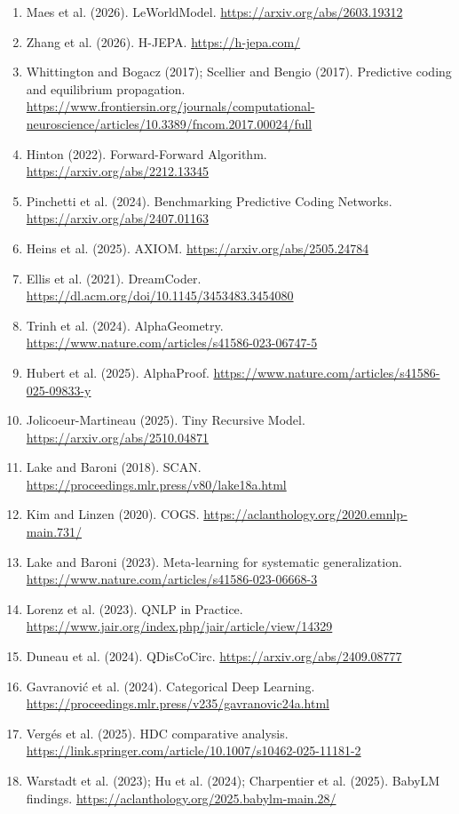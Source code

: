 \begin{enumerate}[leftmargin=*,itemsep=2pt]
\item Maes et al. (2026). LeWorldModel. \url{https://arxiv.org/abs/2603.19312}
\item Zhang et al. (2026). H-JEPA. \url{https://h-jepa.com/}
\item Whittington and Bogacz (2017); Scellier and Bengio (2017). Predictive coding and equilibrium propagation. \url{https://www.frontiersin.org/journals/computational-neuroscience/articles/10.3389/fncom.2017.00024/full}
\item Hinton (2022). Forward-Forward Algorithm. \url{https://arxiv.org/abs/2212.13345}
\item Pinchetti et al. (2024). Benchmarking Predictive Coding Networks. \url{https://arxiv.org/abs/2407.01163}
\item Heins et al. (2025). AXIOM. \url{https://arxiv.org/abs/2505.24784}
\item Ellis et al. (2021). DreamCoder. \url{https://dl.acm.org/doi/10.1145/3453483.3454080}
\item Trinh et al. (2024). AlphaGeometry. \url{https://www.nature.com/articles/s41586-023-06747-5}
\item Hubert et al. (2025). AlphaProof. \url{https://www.nature.com/articles/s41586-025-09833-y}
\item Jolicoeur-Martineau (2025). Tiny Recursive Model. \url{https://arxiv.org/abs/2510.04871}
\item Lake and Baroni (2018). SCAN. \url{https://proceedings.mlr.press/v80/lake18a.html}
\item Kim and Linzen (2020). COGS. \url{https://aclanthology.org/2020.emnlp-main.731/}
\item Lake and Baroni (2023). Meta-learning for systematic generalization. \url{https://www.nature.com/articles/s41586-023-06668-3}
\item Lorenz et al. (2023). QNLP in Practice. \url{https://www.jair.org/index.php/jair/article/view/14329}
\item Duneau et al. (2024). QDisCoCirc. \url{https://arxiv.org/abs/2409.08777}
\item Gavranović et al. (2024). Categorical Deep Learning. \url{https://proceedings.mlr.press/v235/gavranovic24a.html}
\item Vergés et al. (2025). HDC comparative analysis. \url{https://link.springer.com/article/10.1007/s10462-025-11181-2}
\item Warstadt et al. (2023); Hu et al. (2024); Charpentier et al. (2025). BabyLM findings. \url{https://aclanthology.org/2025.babylm-main.28/}

\end{enumerate}
